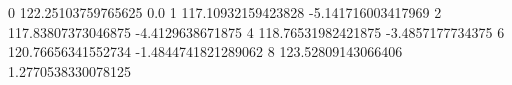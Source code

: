 0 122.25103759765625 0.0
1 117.10932159423828 -5.141716003417969
2 117.83807373046875 -4.4129638671875
4 118.76531982421875 -3.4857177734375
6 120.76656341552734 -1.4844741821289062
8 123.52809143066406 1.2770538330078125
